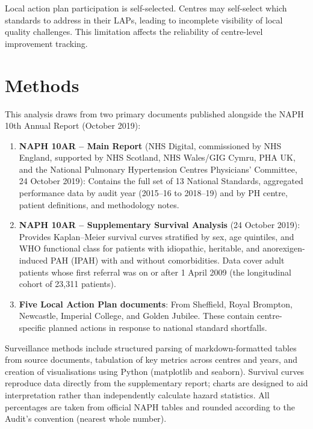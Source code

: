 \documentclass[11pt,a4paper]{article}
\begin{document}
Local action plan participation is self-selected. Centres may self-select which standards to address in their LAPs, leading to incomplete visibility of local quality challenges. This limitation affects the reliability of centre-level improvement tracking.

\section{Methods}

This analysis draws from two primary documents published alongside the NAPH 10th Annual Report (October 2019):

\begin{enumerate}[leftmargin=*, nosep]
    \item \textbf{NAPH 10AR -- Main Report} (NHS Digital, commissioned by NHS England, supported by NHS Scotland, NHS Wales/GIG Cymru, PHA UK, and the National Pulmonary Hypertension Centres Physicians' Committee, 24 October 2019): Contains the full set of 13 National Standards, aggregated performance data by audit year (2015--16 to 2018--19) and by PH centre, patient definitions, and methodology notes.
    \item \textbf{NAPH 10AR -- Supplementary Survival Analysis} (24 October 2019): Provides Kaplan--Meier survival curves stratified by sex, age quintiles, and WHO functional class for patients with idiopathic, heritable, and anorexigen-induced PAH (IPAH) with and without comorbidities. Data cover adult patients whose first referral was on or after 1 April 2009 (the longitudinal cohort of 23,311 patients).
    \item \textbf{Five Local Action Plan documents}: From Sheffield, Royal Brompton, Newcastle, Imperial College, and Golden Jubilee. These contain centre-specific planned actions in response to national standard shortfalls.
\end{enumerate}

Surveillance methods include structured parsing of markdown-formatted tables from source documents, tabulation of key metrics across centres and years, and creation of visualisations using Python (matplotlib and seaborn). Survival curves reproduce data directly from the supplementary report; charts are designed to aid interpretation rather than independently calculate hazard statistics. All percentages are taken from official NAPH tables and rounded according to the Audit's convention (nearest whole number).

\newpage

\begin{center}
\end{center}
\end{document}
